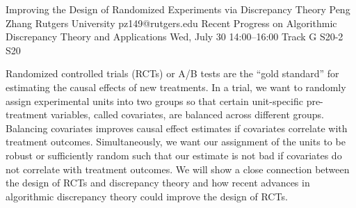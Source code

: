 \begin{talk}
  {Improving the Design of Randomized Experiments via Discrepancy Theory}%
  {Peng Zhang}%
  {Rutgers University}%
  {pz149@rutgers.edu}%
  {Recent Progress on Algorithmic Discrepancy Theory and Applications}%
  {}%
  {Wed, July 30 14:00–16:00 Track G}%
  {S20-2}%
  {S20}%
				
			
Randomized controlled trials (RCTs) or A/B tests are the ``gold standard'' for estimating the causal effects of new treatments. In a trial, we want to randomly assign experimental units into two groups so that certain unit-specific pre-treatment variables, called covariates, are balanced across different groups. Balancing covariates improves causal effect estimates if covariates correlate with treatment outcomes. Simultaneously, we want our assignment of the units to be robust or sufficiently random such that our estimate is not bad if covariates do not correlate with treatment outcomes. We will show a close connection between the design of RCTs and discrepancy theory and how recent advances in algorithmic discrepancy theory could improve the design of RCTs.

\medskip


\end{talk}

